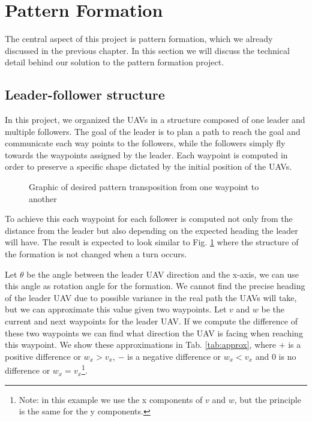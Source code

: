 \newpage

\section{Pattern Formation}

The central aspect of this project is pattern formation, which we already
discussed in the previous chapter. In this section we will discuss the technical
detail behind our solution to the pattern formation project. 

\subsection{Leader-follower structure}

In this project, we organized the UAVs in a structure composed of one leader and
multiple followers. The goal of the leader is to plan a path to reach the goal
and communicate each way points to the followers, while the followers simply
fly towards the waypoints assigned by the leader. Each waypoint is computed in 
order to preserve a specific shape dictated by the initial position of the UAVs.

\begin{figure}[h]
	\begin{center}
		
	\end{center}
	\caption{Graphic of desired pattern transposition from one waypoint to another}\label{fig:pf-1}
\end{figure}

To achieve this each waypoint for each follower is computed not only from the distance 
from the leader but also depending on the expected heading the leader will have. The 
result is expected to look similar to Fig. \ref{fig:pf-1} where the structure of
the formation is not changed when a turn occurs. 

Let $\theta$ be the angle between
the leader UAV direction and the x-axis, we can use this angle as rotation angle for 
the formation. We cannot find the precise heading of the leader UAV due to possible
variance in the real path the UAVs will take, but we can approximate this value given
two waypoints. Let $v$ and $w$ be the current and next waypoints for the leader UAV. 
If we compute the difference of these two waypoints we can find what direction the 
UAV is facing when reaching this waypoint. We show these approximations in Tab. \ref{tab:approx},
where $+$ is a positive difference or $w_x > v_x$, $-$ is a negative difference or $w_x < v_x$
and $0$ is no difference or $w_x = v_x$\footnote{Note: in this example we use the x components of $v$ and $w$, 
but the principle is the same for the y components.}.


